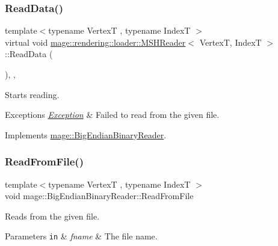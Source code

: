 \subsubsection{\texorpdfstring{Read\+Data()}{ReadData()}}
{\footnotesize\ttfamily template$<$typename VertexT , typename IndexT $>$ \\
virtual void \mbox{\hyperlink{classmage_1_1rendering_1_1loader_1_1_m_s_h_reader}{mage\+::rendering\+::loader\+::\+M\+S\+H\+Reader}}$<$ VertexT, IndexT $>$\+::Read\+Data (\begin{DoxyParamCaption}{ }\end{DoxyParamCaption})\hspace{0.3cm}{\ttfamily [override]}, {\ttfamily [private]}, {\ttfamily [virtual]}}

Starts reading.


\begin{DoxyExceptions}{Exceptions}
{\em \mbox{\hyperlink{classmage_1_1_exception}{Exception}}} & Failed to read from the given file. \\
\hline
\end{DoxyExceptions}


Implements \mbox{\hyperlink{classmage_1_1_big_endian_binary_reader_a7dc0689d598fa91308597b129516a11d}{mage\+::\+Big\+Endian\+Binary\+Reader}}.

\mbox{\label{classmage_1_1rendering_1_1loader_1_1_m_s_h_reader_a68db676feaa42c1c3a9bf16d0680b04f}} 
\subsubsection{\texorpdfstring{Read\+From\+File()}{ReadFromFile()}}
{\footnotesize\ttfamily template$<$typename VertexT , typename IndexT $>$ \\
void mage\+::\+Big\+Endian\+Binary\+Reader\+::\+Read\+From\+File}

Reads from the given file.


\begin{DoxyParams}[1]{Parameters}
\mbox{\tt in}  & {\em fname} & The file name. \\
\hline
\end{DoxyParams}

